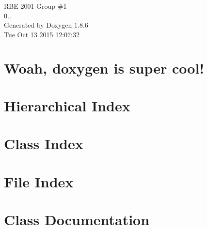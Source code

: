 \documentclass[twoside]{book}
\newcommand{\clearemptydoublepage}{%
  \newpage{\pagestyle{empty}\cleardoublepage}%
}
\begin{document}
\hypersetup{pageanchor=false}
\begin{titlepage}
\vspace*{7cm}
\begin{center}%
{\Large R\-B\-E 2001 Group \#1 \\[1ex]\large 0.. }\\
\vspace*{1cm}
{\large Generated by Doxygen 1.8.6}\\
\vspace*{0.5cm}
{\small Tue Oct 13 2015 12:07:32}\\
\end{center}
\end{titlepage}
\clearemptydoublepage
\tableofcontents
\clearemptydoublepage
{}
\hypersetup{pageanchor=true}

\chapter{Woah, doxygen is super cool!}
\label{index}\hypertarget{index}{}
\chapter{Hierarchical Index}

\chapter{Class Index}

\chapter{File Index}

\chapter{Class Documentation}


































\end{document}

